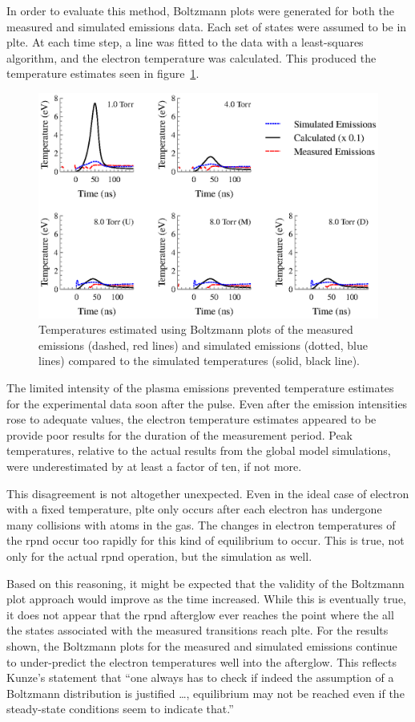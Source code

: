 In order to evaluate this method, Boltzmann plots were generated for both the
measured and simulated emissions data. Each set of states were assumed to be in
\acs{plte}. At each time step, a line was fitted to the data with a
least-squares algorithm, and the electron temperature was calculated. This
produced the temperature estimates seen in figure~\ref{fig:boltcomp}.
\begin{figure}
  \centering
  \includegraphics{./chapters/emissions/figures/boltcomp.eps}
  \caption{Temperatures estimated using Boltzmann plots of the measured emissions
    (dashed, red lines) and simulated emissions (dotted, blue lines) compared to
    the simulated temperatures (solid, black line).}
  \label{fig:boltcomp}
\end{figure}
The limited intensity of the plasma emissions prevented temperature estimates
for the experimental data soon after the pulse. Even after the emission
intensities rose to adequate values, the electron temperature estimates appeared
to be provide poor results for the duration of the measurement period. Peak
temperatures, relative to the actual results from the global model simulations,
were underestimated by at least a factor of ten, if not more.

This disagreement is not altogether unexpected. Even in the ideal case of
electron with a fixed temperature, \acs{plte} only occurs after each electron
has undergone many collisions with atoms in the gas. The changes in electron
temperatures of the \acs{rpnd} occur too rapidly for this kind of equilibrium to
occur. This is true, not only for the actual \acs{rpnd} operation, but the
simulation as well.

Based on this reasoning, it might be expected that the validity of the Boltzmann
plot approach would improve as the time increased. While this is eventually
true, it does not appear that the \acs{rpnd} afterglow ever reaches the point
where the all the states associated with the measured transitions reach
\acs{plte}. For the results shown, the Boltzmann plots for the measured and
simulated emissions continue to under-predict the electron temperatures well
into the afterglow. This reflects Kunze's statement that ``one always has to
check if indeed the assumption of a Boltzmann distribution is justified \ldots,
equilibrium may not be reached even if the steady-state conditions seem to
indicate that.'' \cite{Kunze2009}

